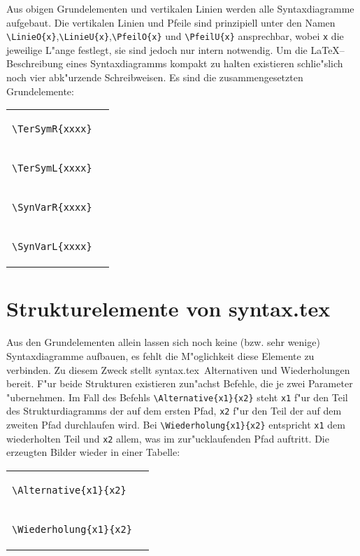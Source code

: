\documentclass{article}
\newcommand{\syn}{syntax.tex}
\newcommand{\dx}{\rule{2mm}{0pt}}
\begin{document}
Aus obigen Grundelementen und vertikalen Linien werden alle Syntaxdiagramme 
aufgebaut. Die vertikalen Linien und Pfeile sind prinzipiell unter den 
Namen 
\verb+\LinieO{x}+,\verb+\LinieU{x}+,\verb+\PfeilO{x}+ und \verb+\PfeilU{x}+
ansprechbar, wobei \verb+x+ die jeweilige L"ange festlegt, sie sind
jedoch nur intern notwendig.  
Um die \LaTeX --Beschreibung eines Syntaxdiagramms kompakt zu halten 
existieren schlie"slich noch vier abk"urzende Schreibweisen. Es sind 
die zusammengesetzten Grundelemente:
\medskip

\begin{tabular}{l|c}
  \verb+\TerSymR{xxxx}+ & 
   \begin{Syntaxdiagramm}\dx\TerSymR{xxxx}\dx\end{Syntaxdiagramm} \\
  \verb+\TerSymL{xxxx}+ & 
   \begin{Syntaxdiagramm}\dx\TerSymL{xxxx}\dx\end{Syntaxdiagramm} \\
  \verb+\SynVarR{xxxx}+ & 
   \begin{Syntaxdiagramm}\dx\SynVarR{xxxx}\dx\end{Syntaxdiagramm} \\
  \verb+\SynVarL{xxxx}+ & 
   \begin{Syntaxdiagramm}\dx\SynVarL{xxxx}\dx\end{Syntaxdiagramm} \\
\end{tabular}
\medskip

\section{Strukturelemente von \syn}
Aus den Grundelementen allein lassen sich noch keine (bzw. sehr wenige)
Syntaxdiagramme aufbauen, es fehlt die M"oglichkeit diese Elemente zu
verbinden. Zu diesem Zweck stellt \syn\ Alternativen und Wiederholungen
bereit.
F"ur beide Strukturen existieren zun"achst Befehle, die je
zwei Parameter "ubernehmen. Im Fall des Befehls 
\verb+\Alternative{x1}{x2}+ steht \verb+x1+ f"ur den Teil des 
Strukturdiagramms der auf dem ersten Pfad, \verb+x2+
f"ur den Teil der auf dem zweiten Pfad durchlaufen wird.
Bei \verb+\Wiederholung{x1}{x2}+ entspricht \verb+x1+ dem wiederholten
Teil und \verb+x2+ allem, was im zur"ucklaufenden Pfad auftritt.
Die erzeugten Bilder wieder in einer Tabelle:
\medskip

\begin{tabular}{l|c}
  \verb+\Alternative{x1}{x2}+ & 
   \begin{Syntaxdiagramm}\dx\Alternative{x1}{x2}\dx\end{Syntaxdiagramm} \\
  \verb+\Wiederholung{x1}{x2}+ & 
   \begin{Syntaxdiagramm}\dx\Wiederholung{x1}{x2}\dx\end{Syntaxdiagramm} 
\end{tabular}
\medskip
 
\end{document}
